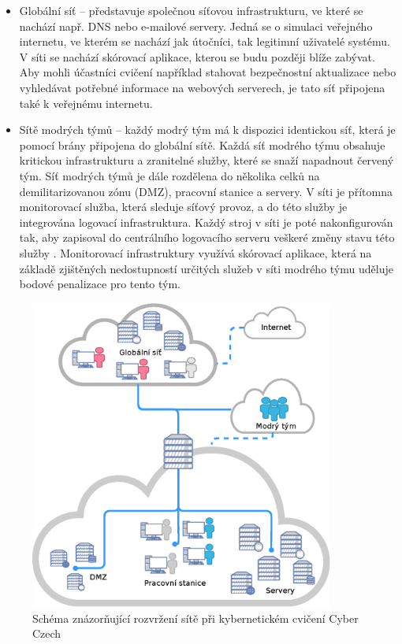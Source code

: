 \documentclass[
  digital, %
  twoside, %
  table,   %
  nolof,     %
  nolot,     %
]{fithesis3}
\begin{document}
\begin{itemize}
    \item Globální síť -- představuje společnou síťovou infrastrukturu, ve které se nachází např. DNS nebo e-mailové servery. Jedná se o simulaci veřejného internetu, ve kterém se nachází jak útočníci, tak legitimní uživatelé systému. V síti se nachází skórovací aplikace, kterou se budu později blíže zabývat. Aby mohli účastníci cvičení například stahovat bezpečnostní aktualizace nebo vyhledávat potřebné informace na webových serverech, je tato síť připojena také k veřejnému internetu.
    \item Sítě modrých týmů -- každý modrý tým má k dispozici identickou síť, která je pomocí brány připojena do globální sítě. Každá síť modrého týmu obsahuje kritickou infrastrukturu a zranitelné služby, které se snaží napadnout červený tým. Síť modrých týmů je dále rozdělena do několika celků na demilitarizovanou zónu (DMZ), pracovní stanice a servery. V síti je přítomna monitorovací služba, která sleduje síťový provoz, a do této služby je integrována logovací infrastruktura. Každý stroj v síti je poté nakonfigurován tak, aby zapisoval do centrálního logovacího serveru veškeré změny stavu této služby \cite{CeledaKYPO-AExercises}. Monitorovací infrastruktury využívá skórovací aplikace, která na základě zjištěných nedostupností určitých služeb v síti modrého týmu uděluje bodové penalizace pro tento tým.
\end{itemize}

\begin{figure}[h]
    \centering
    \includegraphics[width=10cm]{images/kypo-network.eps}
    \caption{Schéma znázorňující rozvržení sítě při kybernetickém cvičení Cyber Czech \cite{Vykopal2017LessonsRange}}
    \label{fig:kypoNetwork}
\end{figure}
\end{document}
